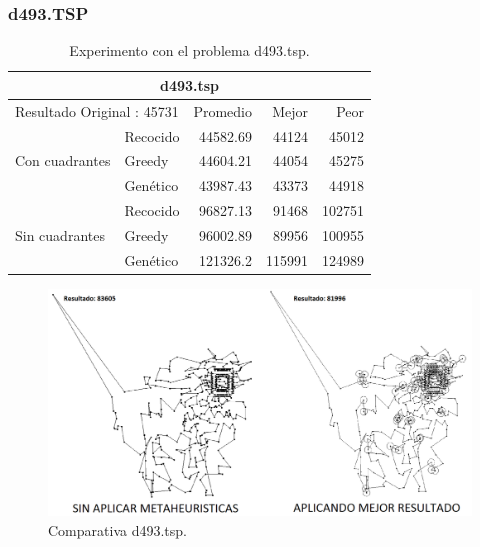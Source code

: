 \subsubsection{d493.TSP}
\begin{table}[hbtp]
 \centering 
    \caption{Experimento con el problema d493.tsp.}
	\begin{tabular}{ | l   l | r | r | r |   }
        \hline\multicolumn{5}{|c|}{ \rowcolor[gray]{0.8} d493.tsp} \\ \hline
        \multicolumn{2}{|l|}{Resultado Original : 45731} & Promedio & Mejor & Peor \\ 
                \hline
                & Recocido  & 44582.69 & 44124 & 45012  \\ 
 Con cuadrantes & Greedy    & 44604.21 & 44054 & 45275  \\ 
                & Genético  & \cellcolor[gray]{0.9} 43987.43 & \cellcolor[gray]{0.9} 43373 & \cellcolor[gray]{0.9} 44918  \\ 
                \hline
                & Recocido  & 96827.13 & 91468 & 102751   \\ 
 Sin cuadrantes & Greedy    & \cellcolor[gray]{0.9} 96002.89 & \cellcolor[gray]{0.9} 89956 & \cellcolor[gray]{0.9} 100955   \\ 
                & Genético  & 121326.2 & 115991 & 124989    \\ 
                \hline
    \end{tabular}
    \label{table:EXP_d493.tsp}
\end{table}
\begin{figure}[hbtp]
    \centering
        \includegraphics[width=1\textwidth]{PruebasResultados/Experimentos_Comparativas/d493.png}
        \caption{Comparativa d493.tsp.}
        \label{fig:d493_comparativa.png}
\end{figure}
